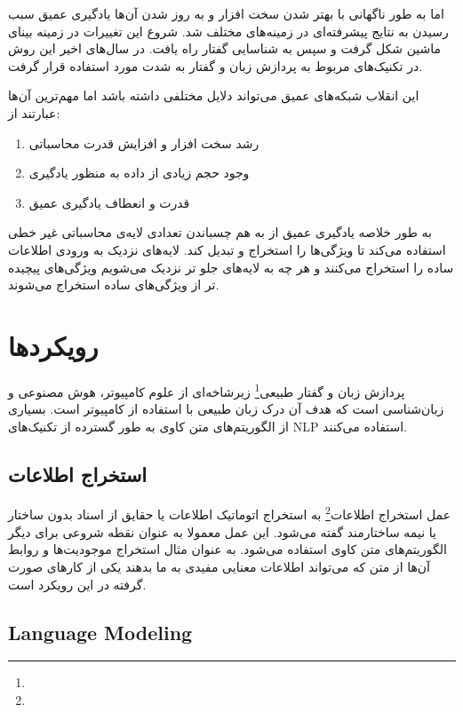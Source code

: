 \documentclass[12pt, a4paper, oneside]{report}
\begin{document}
اما به طور ناگهانی با بهتر شدن سخت افزار و به روز شدن آن‌ها یادگیری عمیق سبب رسیدن به نتایج پیشرفته‌ای در زمینه‌های مختلف شد.
شروع این تغییرات در زمینه بینای ماشین شکل گرفت و سپس به شناسایی گفتار راه یافت. در سال‌های اخیر این روش در تکنیک‌های
مربوط به پردازش زبان و گفتار به شدت مورد استفاده قرار گرفت.

این انقلاب شبکه‌های عمیق می‌تواند دلایل مختلفی داشته باشد اما مهم‌ترین آن‌ها عبارتند از:

\begin{enumerate}
	\item رشد سخت افزار و افزایش قدرت محاسباتی
	\item وجود حجم زیادی از داده به منظور یادگیری
	\item قدرت و انعطاف یادگیری عمیق
\end{enumerate}

به طور خلاصه یادگیری عمیق از به هم چسباندن تعدادی لایه‌ی محاسباتی غیر خطی استفاده می‌کند تا ویژگی‌ها را استخراج و تبدیل کند.
لایه‌های نزدیک به ورودی اطلاعات ساده را استخراج می‌کنند و هر چه به لایه‌های جلو تر نزدیک می‌شویم ویژگی‌های پیچیده تر
از ویژگی‌های ساده استخراج می‌شوند.

\section{رویکردها}

پردازش زبان و گفتار طبیعی\footnote{}
زیرشاخه‌ای از علوم کامپیوتر، هوش مصنوعی و زبان‌شناسی است که هدف آن درک زبان طبیعی با
استفاده از کامپیوتر است. بسیاری از الگوریتم‌های متن کاوی به طور گسترده از تکنیک‌های
NLP
استفاده می‌کنند\cite{DBLP:journals/corr/AllahyariPASTGK17a}.

\subsection{استخراج اطلاعات}

عمل 
استخراج اطلاعات\footnote{}
به استخراج اتوماتیک اطلاعات یا حقایق از اسناد بدون ساختار یا نیمه ساختارمند گفته می‌شود.
این عمل معمولا به عنوان نقطه شروعی برای دیگر الگوریتم‌های متن کاوی استفاده می‌شود. به عنوان مثال استخراج
موجودیت‌ها و روابط آن‌ها از متن که می‌تواند اطلاعات معنایی مفیدی به ما بدهند یکی از کار‌های صورت گرفته
در این رویکرد است\cite{DBLP:journals/corr/AllahyariPASTGK17a}.

\subsection{Language Modeling}
\end{document}
